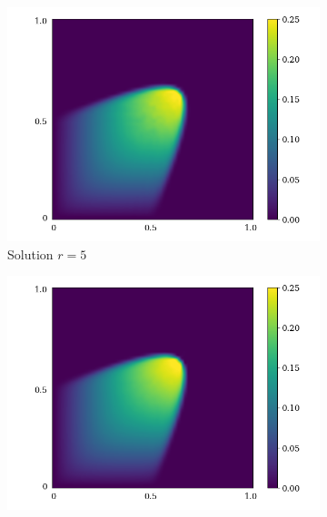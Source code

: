\begin{figure}[ht!]
     \begin{center}
        \begin{subfigure}[b]{0.20\textwidth}
            \begin{center}
                \includegraphics[trim = {0, 0, 3cm, 0}, clip, width=\textwidth]{Pictures/X-rom-LE-CNNAE-5.png}
            \end{center}
             \caption{Solution $r = 5$}
         \end{subfigure}
    \begin{subfigure}[b]{0.20\textwidth}
            \begin{center}
                \includegraphics[trim = {0, 0, 3cm, 0}, clip, width=\textwidth]{Pictures/X-rom-LE-CNNAE-10.png}

\end{center}
\end{subfigure}
\end{center}
\end{figure}
